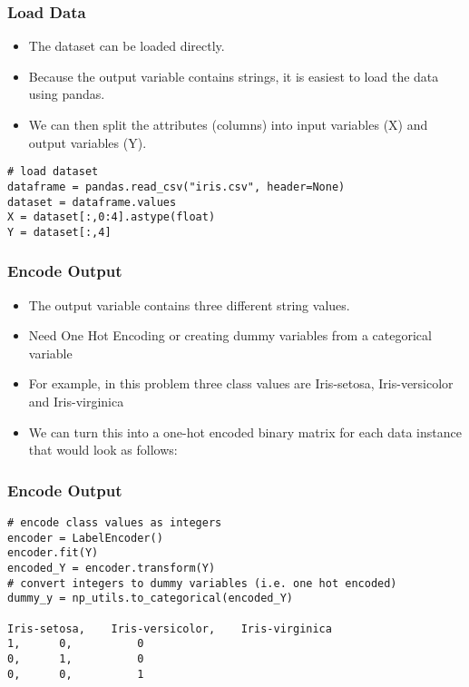\begin{frame}[fragile] \frametitle{Load Data}
 \begin{itemize}
 \item  The dataset can be loaded directly. 
 \item Because the output variable contains strings, it is easiest to load the data using pandas. 
 \item We can then split the attributes (columns) into input variables (X) and output variables (Y).
 \end{itemize}
\begin{lstlisting}
# load dataset
dataframe = pandas.read_csv("iris.csv", header=None)
dataset = dataframe.values
X = dataset[:,0:4].astype(float)
Y = dataset[:,4]
\end{lstlisting}
\end{frame}

\begin{frame}[fragile] \frametitle{ Encode Output}
 \begin{itemize}
 \item  The output variable contains three different string values.
 \item Need One Hot Encoding or creating dummy variables from a categorical variable
 \item For example, in this problem three class values are Iris-setosa, Iris-versicolor and Iris-virginica
 \item We can turn this into a one-hot encoded binary matrix for each data instance that would look as follows:
 \end{itemize}
\end{frame}

\begin{frame}[fragile] \frametitle{ Encode Output}
\begin{lstlisting}
# encode class values as integers
encoder = LabelEncoder()
encoder.fit(Y)
encoded_Y = encoder.transform(Y)
# convert integers to dummy variables (i.e. one hot encoded)
dummy_y = np_utils.to_categorical(encoded_Y)

Iris-setosa,	Iris-versicolor,	Iris-virginica
1,		0,			0
0,		1, 			0
0, 		0, 			1
\end{lstlisting}
\end{frame}

